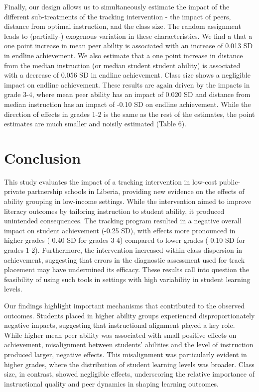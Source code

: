 \documentclass[12pt]{article}
\begin{document}
Finally, our design allows us to simultaneously estimate the impact of the different sub-treatments of the tracking intervention - the impact of peers, distance from optimal instruction, and the class size. The random assignment leads to (partially-) exogenous variation in these characteristics. We find a that a one point increase in mean peer ability is associated with an increase of 0.013 SD in endline achievement. We also estimate that a one point increase in distance from the median instruction (or median student student ability) is associated with a decrease of 0.056 SD in endline achievement. Class size shows a negligible impact on endline achievement. These results are again driven by the impacts in grade 3-4, where mean peer ability has an impact of 0.020 SD and distance from median instruction has an impact of -0.10 SD on endline achievement. While the direction of effects in grades 1-2 is the same as the rest of the estimates, the point estimates are much smaller and noisily estimated (Table 6). 


\section{Conclusion}
\label{sec:discuss}

This study evaluates the impact of a tracking intervention in low-cost public-private partnership schools in Liberia, providing new evidence on the effects of ability grouping in low-income settings. While the intervention aimed to improve literacy outcomes by tailoring instruction to student ability, it produced unintended consequences. The tracking program resulted in a negative overall impact on student achievement (-0.25 SD), with effects more pronounced in higher grades (-0.40 SD for grades 3-4) compared to lower grades (-0.10 SD for grades 1-2). Furthermore, the intervention increased within-class dispersion in achievement, suggesting that errors in the diagnostic assessment used for track placement may have undermined its efficacy. These results call into question the feasibility of using such tools in settings with high variability in student learning levels.

Our findings highlight important mechanisms that contributed to the observed outcomes. Students placed in higher ability groups experienced disproportionately negative impacts, suggesting that instructional alignment played a key role. While higher mean peer ability was associated with small positive effects on achievement, misalignment between students’ abilities and the level of instruction produced larger, negative effects. This misalignment was particularly evident in higher grades, where the distribution of student learning levels was broader. Class size, in contrast, showed negligible effects, underscoring the relative importance of instructional quality and peer dynamics in shaping learning outcomes.
\end{document}
